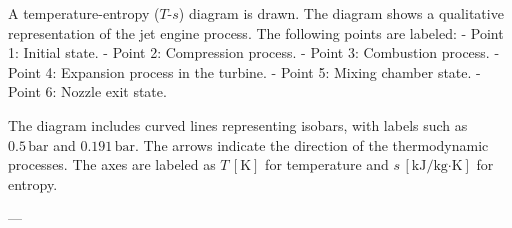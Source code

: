 A temperature-entropy (\(T\)-\(s\)) diagram is drawn. The diagram shows a qualitative representation of the jet engine process. The following points are labeled:  
- Point 1: Initial state.  
- Point 2: Compression process.  
- Point 3: Combustion process.  
- Point 4: Expansion process in the turbine.  
- Point 5: Mixing chamber state.  
- Point 6: Nozzle exit state.  

The diagram includes curved lines representing isobars, with labels such as \(0.5 \, \text{bar}\) and \(0.191 \, \text{bar}\). The arrows indicate the direction of the thermodynamic processes. The axes are labeled as \(T \, [\text{K}]\) for temperature and \(s \, [\text{kJ/kg·K}]\) for entropy.

---